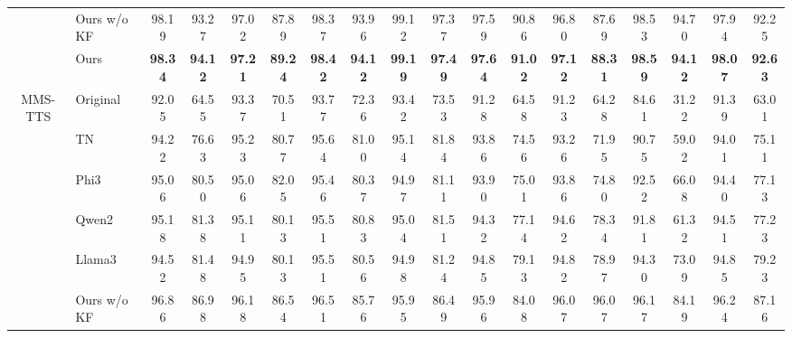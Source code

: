\documentclass[11pt]{article}
\begin{document}
\begin{table}[tb]
{\begin{tabular}{clcccccccccccccccc}
				& Ours w/o KF             & 98.19          & 93.27          & 97.02          & 87.89          & 98.37          & 93.96          & 99.12          & 97.37          & 97.59          & 90.86          & 96.80          & 87.69          & 98.53          & 94.70          & 97.94          & 92.25          \\
				& Ours                    & \textbf{98.34} & \textbf{94.12} & \textbf{97.21} & \textbf{89.24} & \textbf{98.42} & \textbf{94.12} & \textbf{99.19} & \textbf{97.49} & \textbf{97.64} & \textbf{91.02} & \textbf{97.12} & \textbf{88.31} & \textbf{98.59} & \textbf{94.12} & \textbf{98.07} & \textbf{92.63} \\
				\midrule
				\multirow{7}{*}{MMS-TTS}         & Original                & 92.05          & 64.55          & 93.37          & 70.51          & 93.77          & 72.36          & 93.42          & 73.53          & 91.28          & 64.58          & 91.23          & 64.28          & 84.61          & 31.22          & 91.39          & 63.01          \\
				& TN                      & 94.22          & 76.63          & 95.23          & 80.77          & 95.64          & 81.00          & 95.14          & 81.84          & 93.86          & 74.56          & 93.26          & 71.95          & 90.75          & 59.02          & 94.01          & 75.11          \\
				& Phi3                    & 95.06          & 80.50          & 95.06          & 82.05          & 95.46          & 80.37          & 94.97          & 81.11          & 93.90          & 75.01          & 93.86          & 74.80          & 92.52          & 66.08          & 94.40          & 77.13          \\
				& Qwen2                   & 95.18          & 81.38          & 95.11          & 80.13          & 95.51          & 80.83          & 95.04          & 81.51          & 94.32          & 77.14          & 94.62          & 78.34          & 91.81          & 61.32          & 94.51          & 77.23          \\
				& Llama3                  & 94.52          & 81.48          & 94.95          & 80.13          & 95.51          & 80.56          & 94.98          & 81.24          & 94.85          & 79.13          & 94.82          & 78.97          & 94.30          & 73.09          & 94.85          & 79.23          \\
				& Ours w/o KF             & 96.86          & 86.98          & 96.18          & 86.54          & 96.51          & 85.76          & 95.95          & 86.49          & 95.96          & 84.08          & 96.07          & 96.07          & 96.17          & 84.19          & 96.24          & 87.16          \\

\end{tabular}}
\end{table}
\end{document}
